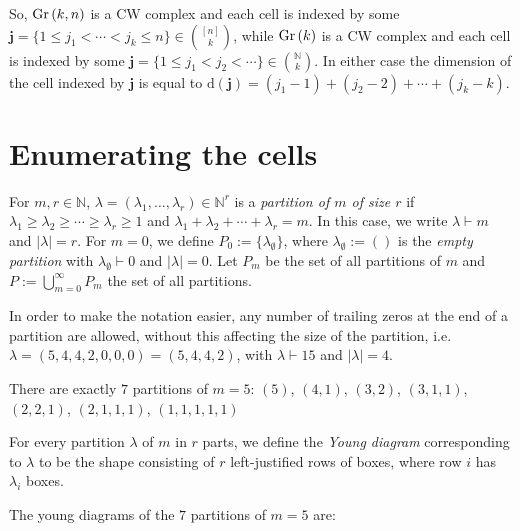 So, $\Gr{k}{n}$ is a CW complex and each cell is indexed by some $\mathbf{j}=\{1\leq j_1<\cdots<j_k\leq n\}\in\binom{[n]}{k}$, while $\Gr{k}$ is a CW complex and each cell is indexed by some $\mathbf{j}=\{1\leq j_1<j_2<\cdots\}\in\binom{\mathbb{N}}{k}$. In either case the dimension of the cell indexed by $\mathbf{j}$ is equal to $\mathrm{d}(\mathbf{j})=(j_1-1)+(j_2-2)+\cdots+(j_k-k)$.

\section{Enumerating the cells}
\begin{definition} For $m,r\in\mathbb{N}$, $\lambda=(\lambda_1,\ldots,\lambda_r)\in\mathbb{N}^r$ is a \emph{partition of $m$ of size $r$} if $\lambda_1\geq\lambda_2\geq\cdots\geq\lambda_r\geq1$ and $\lambda_1+\lambda_2+\cdots+\lambda_r=m$. In this case, we write $\lambda\vdash m$ and $|\lambda|=r$. For $m=0$, we define $P_0:=\{\lambda_{\emptyset}\}$, where $\lambda_{\emptyset}:=()$ is the \emph{empty partition} with $\lambda_{\emptyset}\vdash0$ and $|\lambda|=0$. Let $P_m$ be the set of all partitions of $m$ and $P:=\bigcup_{m=0}^{\infty}P_m$ the set of all partitions.
\end{definition}
\begin{remark}
In order to make the notation easier, any number of trailing zeros at the end of a partition are allowed, without this affecting the size of the partition, i.e.\ $\lambda=(5,4,4,2,0,0,0)=(5,4,4,2)$, with $\lambda\vdash15$ and $|\lambda|=4$.
\end{remark}
\begin{example} There are exactly $7$ partitions of $m=5$:
$(5)$, $(4,1)$, $(3,2)$, $(3,1,1)$, $(2,2,1)$, $(2,1,1,1)$, $(1,1,1,1,1)$
\end{example}

\begin{notation} For every partition $\lambda$ of $m$ in $r$ parts, we define the \emph{Young diagram} corresponding to $\lambda$ to be the shape consisting of $r$ left-justified rows of boxes, where row $i$ has $\lambda_i$ boxes.
\end{notation}
\begin{example} The young diagrams of the $7$ partitions of $m=5$ are:
\begin{center}
\qquad{}\qquad{}\qquad{}\qquad{}\qquad{}\qquad{}
\end{center}
\end{example}


